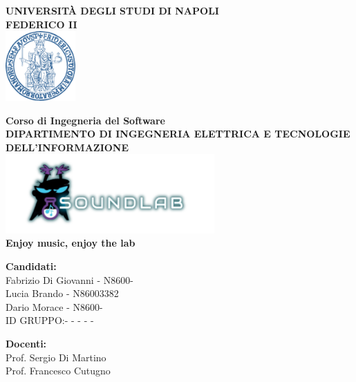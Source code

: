 \documentclass{article}
\begin{document}
	\begin{center}
		\textbf{UNIVERSITÀ DEGLI STUDI DI NAPOLI \\ FEDERICO II}
		\\
		\vspace{1cm}
		\includegraphics[width=0.2\textwidth]{Immagini/logo_universita.png} 
	\end{center}
	
	\vspace{1cm}
	
	\begin{center}
		\textbf{Corso di Ingegneria del Software} \\
		\vspace{0.5cm}
		\textbf{DIPARTIMENTO DI INGEGNERIA ELETTRICA E TECNOLOGIE DELL'INFORMAZIONE} \\
		\vspace{0.5cm}
		\includegraphics[width=0.6\textwidth]{Immagini/logo_sfondo} \\
		\textbf{\textcolor{dark_purple}{Enjoy music, enjoy the lab}}
		
	\end{center}
	
	\vspace{0.5cm}
	
	\begin{center}
		\textbf{Candidati:} \\
		Fabrizio Di Giovanni - N8600- \\
		Lucia Brando - N86003382 \\
		Dario Morace - N8600- \\
		ID GRUPPO:- - - - -\\
	\end{center}
	
	\vspace{0.5cm}
	
	\begin{center}
		\textbf{Docenti:} \\
		Prof. Sergio Di Martino \\
		Prof. Francesco Cutugno
	\end{center}
	
\end{document}
